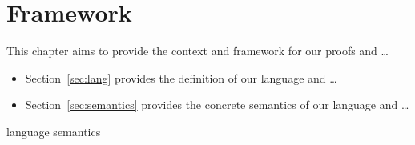 \chapter{Framework}

This chapter aims to provide the context and framework for our proofs
and \dots

\begin{itemize}
\item Section~\ref{sec:lang} provides the definition of our language
  and \dots
\item Section~\ref{sec:semantics} provides the concrete semantics of
  our language and \dots
\end{itemize}

{language}
{semantics}